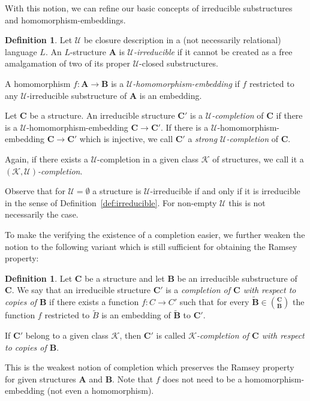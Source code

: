 \documentclass{elsarticle}
\def\str#1{\mathbf {#1}}
\def\K{{\mathcal K}}
\theoremstyle{plain}
\theoremstyle{definition}
\newtheorem{definition}[theorem]{Definition}
\theoremstyle{remark}
\begin{document}
With this notion, we can refine our basic concepts of irreducible substructures and ho\-mo\-mor\-phism-embeddings.
\begin{definition}
\label{def:Uirreducible}
\label{def:Uhomomorphism-embedding}
Let $\mathcal U$ be closure description in a (not necessarily relational) language $L$.
An $L$-structure $\str{A}$ is \emph{$\mathcal{U}$-irreducible} if it cannot be created as a free amalgamation of two of its proper $\mathcal{U}$-closed substructures.

A homomorphism
$f\colon \str{A}\to\str{B}$ is a \emph{$\mathcal U$-homomorphism-embedding}  if $f$ restricted to any $\mathcal U$-irreducible substructure of $\str{A}$ is an embedding.

Let $\str{C}$ be a structure. An irreducible structure $\str{C}'$ is a \emph{$\mathcal U$-completion}
of $\str{C}$ if there is a $\mathcal U$-homomorphism-embedding $\str{C}\to\str{C}'$.
If there is a $\mathcal U$-homomorphism-embedding $\str{C}\to\str{C}'$ which is injective,
we call $\str{C}'$ a \emph{strong $\mathcal U$-completion} of $\str C$.

Again, if there exists a $\mathcal U$-completion in a given class $\mathcal K$ of structures, we call it a \emph{$(\mathcal K,\mathcal U)$-completion}.
\end{definition}
Observe that for $\mathcal{U}=\emptyset$ a structure is $\mathcal U$-irreducible if and only if it is irreducible in the sense of Definition~\ref{def:irreducible}. For non-empty $\mathcal U$ this is not necessarily the case.

To make the verifying the existence of a completion easier, we further weaken the notion to the
following variant which is still sufficient for obtaining the Ramsey property:

\begin{definition}
Let $\str{C}$ be a structure and let $\str{B}$ be an irreducible substructure of $\str{C}$.  We
say that an irreducible structure $\str{C}'$ is a \emph{completion of $\str{C}$ with respect to
copies of $\str{B}$} if there exists a function
$f\colon C\to C'$ such that for every  $\widetilde{\str{B}}\in
{\str{C}\choose \str{B}}$ the function $f$ restricted to $\widetilde{B}$
is an embedding of $\widetilde{\str{B}}$ to $\str{C}'$.

If $\str{C}'$ belong to a given class $\K$, then $\str{C}'$ is called \emph{$\K$-completion of $\str{C}$ with respect to copies of $\str{B}$}.
\end{definition}
This is the weakest notion of completion which preserves the Ramsey property for given structures $\str{A}$ and $\str{B}$. Note that $f$ does not need to be a homo\-morphism-embedding (not even a homomorphism).
\end{document}
